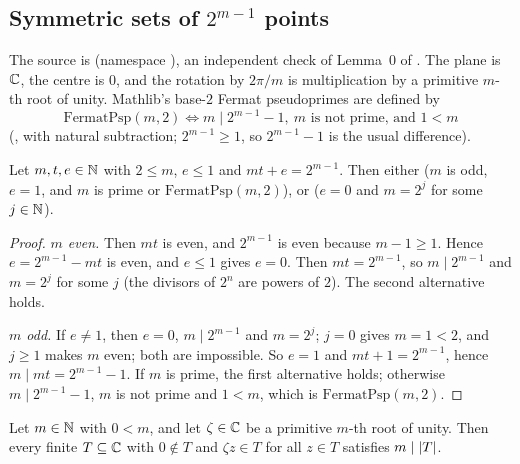 \subsection{Symmetric sets of \texorpdfstring{$2^{m-1}$}{2\^{}(m-1)} points}\label{ec:ssec:l0}

The source is  (namespace ), an independent check of Lemma~0
of . The plane is $\mathbb C$, the centre is $0$, and the rotation by $2\pi/m$ is
multiplication by a primitive $m$-th root of unity. Mathlib's base-$2$ Fermat pseudoprimes are defined by
\begin{equation*}
\mathrm{FermatPsp}(m,2)\iff m\mid2^{m-1}-1,\ m\text{ is not prime, and }1<m
\end{equation*}
(, with natural subtraction; $2^{m-1}\ge1$, so $2^{m-1}-1$ is the usual difference).

\begin{lemma}\label{ec:lem:arith}
Let $m,t,e\in\mathbb N$ with $2\le m$, $e\le1$ and $mt+e=2^{m-1}$. Then either \textup{(}$m$ is odd, $e=1$, and $m$ is prime
or $\mathrm{FermatPsp}(m,2)$\textup{)}, or \textup{(}$e=0$ and $m=2^j$ for some $j\in\mathbb N$\textup{)}.
\end{lemma}

\begin{proof}
\emph{$m$ even.} Then $mt$ is even, and $2^{m-1}$ is even because $m-1\ge1$. Hence $e=2^{m-1}-mt$ is even, and $e\le1$
gives $e=0$. Then $mt=2^{m-1}$, so $m\mid2^{m-1}$ and $m=2^j$ for some $j$ (the divisors of $2^n$ are powers of $2$).
The second alternative holds.

\emph{$m$ odd.} If $e\ne1$, then $e=0$, $m\mid2^{m-1}$ and $m=2^j$; $j=0$ gives $m=1<2$, and $j\ge1$ makes $m$ even;
both are impossible. So $e=1$ and $mt+1=2^{m-1}$, hence $m\mid mt=2^{m-1}-1$. If $m$ is prime, the first
alternative holds; otherwise $m\mid2^{m-1}-1$, $m$ is not prime and $1<m$, which is $\mathrm{FermatPsp}(m,2)$.
\end{proof}

\begin{lemma}\label{ec:lem:orbit-dvd}
Let $m\in\mathbb N$ with $0<m$, and let $\zeta\in\mathbb C$ be a primitive $m$-th root of unity. Then every finite $T\subseteq\mathbb C$
with $0\notin T$ and $\zeta z\in T$ for all $z\in T$ satisfies $m\mid\lvert T\rvert$.
\end{lemma}

